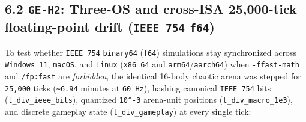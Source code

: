 \documentclass[10pt,letterpaper]{article}
\begin{document}
\subsection{\texorpdfstring{6.2 \texttt{GE-H2}: Three-OS and cross-ISA
25,000-tick floating-point drift (\texttt{IEEE\ 754}
\texttt{f64})}{6.2 GE-H2: Three-OS and cross-ISA 25,000-tick floating-point drift (IEEE 754 f64)}}\label{ge-h2-three-os-and-cross-isa-25000-tick-floating-point-drift-ieee-754-f64}

To test whether \texttt{IEEE\ 754} \texttt{binary64} (\texttt{f64})
simulations stay synchronized across \texttt{Windows\ 11},
\texttt{macOS}, and \texttt{Linux} (\texttt{x86\_64} and
\texttt{arm64}/\allowbreak{}\texttt{aarch64}) when \texttt{-\allowbreak{}ffast-\allowbreak{}math} and
\texttt{/fp:fast} are \emph{forbidden}, the identical 16-body chaotic
arena was stepped for \texttt{25,000} ticks
(\texttt{\textasciitilde{}6.94} minutes at \texttt{60\ Hz}), hashing
canonical \texttt{IEEE\ 754} bits (\texttt{t\_\allowbreak{}div\_\allowbreak{}ieee\_\allowbreak{}bits}),
quantized \texttt{10\^{}-3} arena-unit positions
(\texttt{t\_\allowbreak{}div\_\allowbreak{}macro\_\allowbreak{}1e3}), and discrete gameplay state
(\texttt{t\_\allowbreak{}div\_\allowbreak{}gameplay}) at every single tick:
\end{document}
